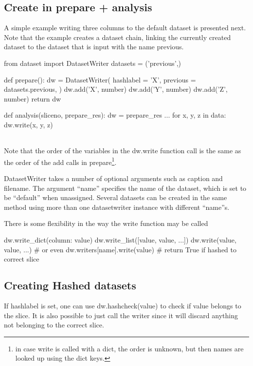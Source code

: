 \subsection{Create in prepare + analysis}
A simple example writing three columns to the default dataset is
presented next.  Note that the example creates a dataset chain,
linking the currently created dataset to the dataset that is input
with the name previous.

\begin{python}
from dataset import DatasetWriter
datasets = ('previous',)

def prepare():
  dw = DatasetWriter(
    hashlabel = 'X',
    previous = datasets.previous,
  )
  dw.add('X', number)
  dw.add('Y', number)
  dw.add('Z', number)
  return dw

def analysis(sliceno, prepare_res):
  dw = prepare_res
  ...
  for x, y, z in data:
    dw.write(x, y, z)
\end{python}
\\
Note that the order of the variables in the dw.write function call is
the same as the order of the add calls in prepare\footnote{in case
  write is called with a dict, the order is unknown, but then names
  are looked up using the dict keys.}.

DatasetWriter takes a number of optional arguments such as caption and
filename.  The argument ``name'' specifies the name of the dataset,
which is set to be ``default'' when unassigned.  Several datasets can
be created in the same method using more than one datasetwriter
instance with different ``name''s.

There is some flexibility in the way the write function may be called

\begin{python}
  dw.write_dict({column: value})
  dw.write_list([value, value, ...])
  dw.write(value, value, ...)
  # or even
  dw.writers[name].write(value)  # return True if hashed to correct slice
\end{python}



\subsection{Creating Hashed datasets}

If hashlabel is set, one can use dw.hashcheck(value) to check if value
belongs to the slice.  It is also possible to just call the writer
since it will discard anything not belonging to the correct slice.



